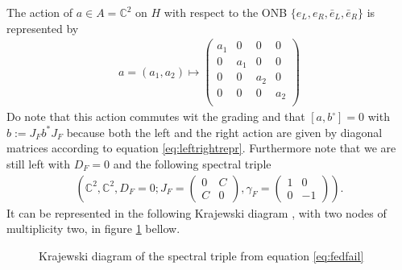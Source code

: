 The action of $a \in A = \mathbb{C}^2$ on $H$ with respect to the ONB
$\{e_L, e_R, \bar{e}_L, \bar{e}_R\}$ is represented by
\begin{align}\label{eq:leftrightrepr}
    a =
    (a_1 , a_2 ) \mapsto
        \begin{pmatrix}
            a_1 &0 &0 &0\\
             0&a_1 &0 &0\\
            0 &0 &a_2 &0\\
            0 &0 &0 &a_2\\
        \end{pmatrix}
\end{align}
Do note that this action commutes wit the grading and that $[a, b^\circ] = 0$
with $b:= J_F b^*J_F$ because both the left and the right action are given by
diagonal matrices according to equation \eqref{eq:leftrightrepr}. Furthermore
note that we are still left with $D_F = 0$ and the following spectral triple
\begin{align}\label{eq:fedfail}
        \left( \mathbb{C}^2, \mathbb{C}^2, D_F=0; J_F =
        \begin{pmatrix}
            0 & C \\ C &0
        \end{pmatrix},
        \gamma _F =
        \begin{pmatrix}
            1 & 0 \\ 0 &-1
        \end{pmatrix}
        \right).
    \end{align}
It can be represented in the following Krajewski diagram \cite{ncgwatler},
with two nodes of multiplicity two, in figure \ref{fig:krajewski} bellow.
    \begin{figure}[H] \centering
        \caption{Krajewski diagram of the spectral triple from equation
        \ref{eq:fedfail}
        \label{fig:krajewski}
    }
    \end{figure}
